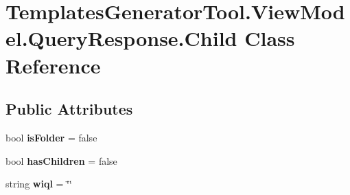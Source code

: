 \hypertarget{class_templates_generator_tool_1_1_view_model_1_1_query_response_1_1_child}{}\section{Templates\+Generator\+Tool.\+View\+Model.\+Query\+Response.\+Child Class Reference}
\label{class_templates_generator_tool_1_1_view_model_1_1_query_response_1_1_child}
\subsection*{Public Attributes}
\begin{DoxyCompactItemize}
\item 
\mbox{\label{class_templates_generator_tool_1_1_view_model_1_1_query_response_1_1_child_aee41d77c3d1806b2e48f3add0e603582}} 
bool {\bfseries is\+Folder} = false
\item 
\mbox{\label{class_templates_generator_tool_1_1_view_model_1_1_query_response_1_1_child_a626352a01c278f914389c2c6cd11fe8a}} 
bool {\bfseries has\+Children} = false
\item 
\mbox{\label{class_templates_generator_tool_1_1_view_model_1_1_query_response_1_1_child_a5fed7d29046d2ae590e419302c987145}} 
string {\bfseries wiql} = \char`\"{}\char`\"{}
\end{DoxyCompactItemize}
